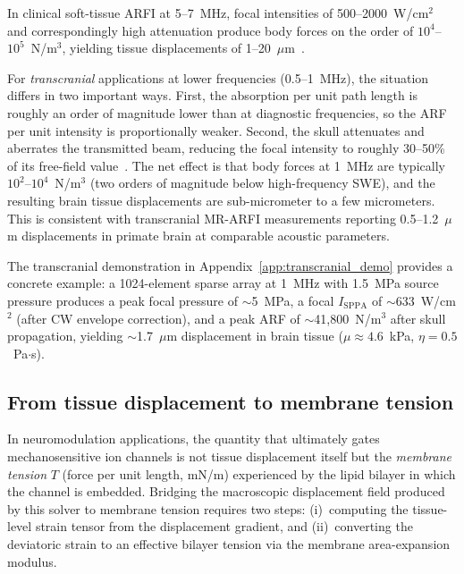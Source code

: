 \documentclass[11pt]{article}
\begin{document}
\noindent
In clinical soft-tissue ARFI at 5--7~MHz, focal intensities of
500--2000~W/cm$^2$ and correspondingly high attenuation produce body
forces on the order of $10^4$--$10^5$~N/m$^3$, yielding tissue
displacements of
1--20~$\mu$m~\cite{nightingale2002radiation,palmeri2005fem,palmeri2011radiation}.

For \emph{transcranial} applications at lower frequencies (0.5--1~MHz), the
situation differs in two important ways.  First, the absorption per unit
path length is roughly an order of magnitude lower than at diagnostic
frequencies, so the ARF per unit intensity is proportionally weaker.
Second, the skull attenuates and aberrates the transmitted beam, reducing
the focal intensity to roughly 30--50\% of its free-field
value~\cite{pinton2012braintherapy}.  The net effect is that body forces at
1~MHz are typically $10^2$--$10^4$~N/m$^3$ (two orders of magnitude below
high-frequency SWE), and the resulting brain tissue displacements are
sub-micrometer to a few micrometers.  This is consistent with transcranial
MR-ARFI measurements reporting 0.5--1.2~$\mu$m displacements in primate
brain at comparable acoustic parameters.

The transcranial demonstration in Appendix~\ref{app:transcranial_demo}
provides a concrete example: a 1024-element sparse array at 1~MHz with
1.5~MPa source pressure produces a peak focal pressure of $\sim$5~MPa,
a focal $I_{\mathrm{SPPA}}$ of $\sim$633~W/cm$^2$ (after CW envelope
correction), and a peak ARF of
$\sim$41{,}800~N/m$^3$ after skull propagation, yielding $\sim$1.7~$\mu$m
displacement in brain tissue ($\mu \approx 4.6$~kPa, $\eta = 0.5$~Pa$\cdot$s).

\subsection{From tissue displacement to membrane tension}
In neuromodulation applications, the quantity that ultimately gates
mechanosensitive ion channels is not tissue displacement itself but the
\emph{membrane tension} $T$ (force per unit length, mN/m) experienced by
the lipid bilayer in which the channel is embedded.  Bridging the
macroscopic displacement field produced by this solver to membrane tension
requires two steps: (i)~computing the tissue-level strain tensor from the
displacement gradient, and (ii)~converting the deviatoric strain to an
effective bilayer tension via the membrane area-expansion modulus.
\end{document}
